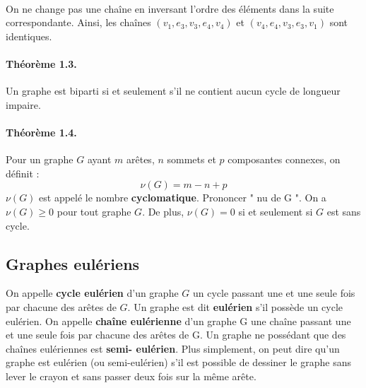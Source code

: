 \paragraph*{}
\noindent On ne change pas une chaîne en inversant l'ordre des éléments dans la suite correspondante.
Ainsi, les chaînes $ (v_{1} , e_{3} , v_{3} , e_{4} , v_{4} ) $ et
 $ (v_{4} , e_{4} , v_{3} , e_{3} , v_{1} )$ sont identiques.
 
\paragraph*{Théorème 1.3.} Un graphe est biparti si et seulement s’il ne contient aucun cycle de longueur impaire.

\paragraph*{Théorème 1.4.} Pour un graphe $ G $ ayant $ m $ arêtes, $ n $ sommets et $ p $ composantes connexes, on définit :
$$ \nu (G) =m-n+p$$
$ \nu (G) $ est appelé le nombre \textbf{cyclomatique}. Prononcer " nu de G ".
On a $ \nu (G) \geq  0$ pour tout graphe $ G $.
De plus, $ \nu (G) = 0 $ si et seulement si $ G $ est sans cycle.

\subsection{Graphes eulériens}
On appelle \textbf{cycle eulérien} d'un graphe $ G $ un cycle passant une et une seule fois par chacune
des arêtes de $ G $. Un graphe est dit \textbf{eulérien} s'il possède un cycle eulérien.
On appelle \textbf{chaîne eulérienne} d'un graphe G une chaîne passant une et une seule fois par
chacune des arêtes de G. Un graphe ne possédant que des chaînes eulériennes est \textbf{semi-
eulérien}.
Plus simplement, on peut dire qu'un graphe est eulérien (ou semi-eulérien) s'il est possible
de dessiner le graphe sans lever le crayon et sans passer deux fois sur la même arête.

